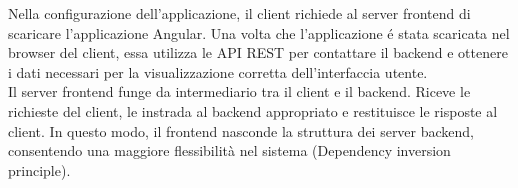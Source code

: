 Nella configurazione dell'applicazione, il client richiede al server frontend di scaricare l'applicazione Angular. Una volta che l'applicazione é stata scaricata nel browser del client, essa utilizza le API REST per contattare il backend e ottenere i dati necessari per la visualizzazione corretta dell'interfaccia utente.\\

Il server frontend funge da intermediario tra il client e il backend. Riceve le richieste del client, le instrada al backend appropriato e restituisce le risposte al client. In questo modo, il frontend nasconde la struttura dei server backend, consentendo una maggiore flessibilità nel sistema (Dependency inversion principle).\